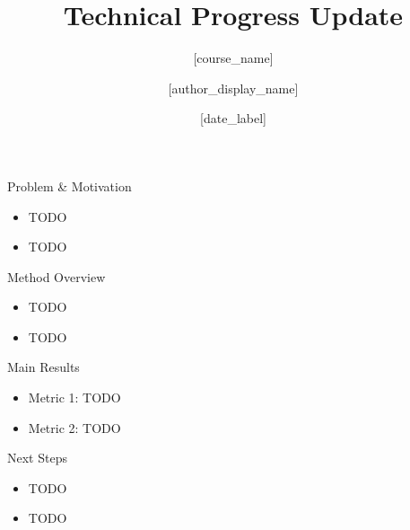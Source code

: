 \documentclass[aspectratio=169]{beamer}
\title{Technical Progress Update}
\subtitle{[course_name]}
\author{[author_display_name]\\[affiliation]}
\date{[date_label]}
\begin{document}
\begin{frame}
  \titlepage
\end{frame}

\begin{frame}{Problem \& Motivation}
  \begin{itemize}
    \item TODO
    \item TODO
  \end{itemize}
\end{frame}

\begin{frame}{Method Overview}
  \begin{itemize}
    \item TODO
    \item TODO
  \end{itemize}
\end{frame}

\begin{frame}{Main Results}
  \begin{itemize}
    \item Metric 1: TODO
    \item Metric 2: TODO
  \end{itemize}
\end{frame}

\begin{frame}{Next Steps}
  \begin{itemize}
    \item TODO
    \item TODO
  \end{itemize}
\end{frame}
\end{document}
